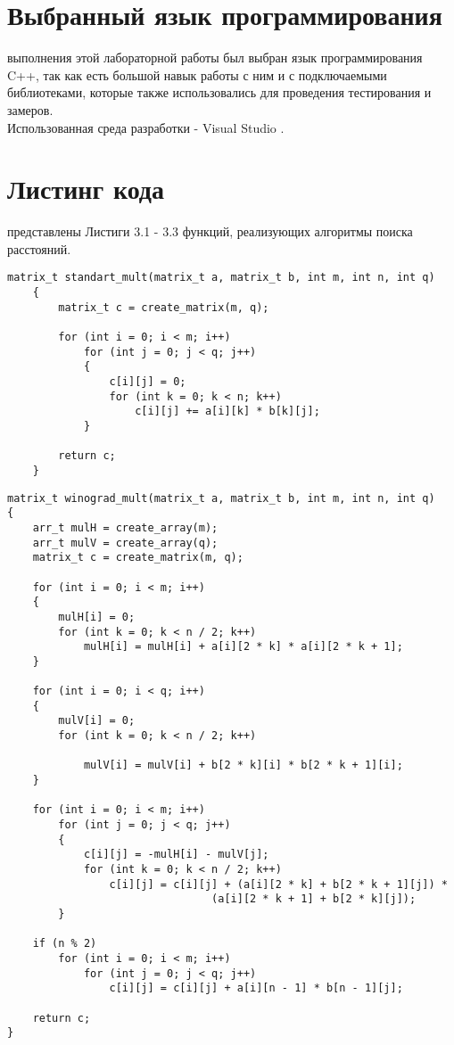 \section{Выбранный язык программирования}
 выполнения этой лабораторной работы был выбран язык программирования C++, так как есть большой навык работы с ним и с подключаемыми библиотеками, которые также использовались для проведения тестирования и замеров.\\

Использованная среда разработки - Visual Studio \cite{Visual}.

\section{Листинг кода}
 представлены Листиги 3.1 - 3.3 функций, реализующих алгоритмы поиска расстояний.
\begin{lstlisting}[label=code, caption = Стандартный алгоритм умножения матриц]
	matrix_t standart_mult(matrix_t a, matrix_t b, int m, int n, int q)
	{
		matrix_t c = create_matrix(m, q);
		
		for (int i = 0; i < m; i++)
			for (int j = 0; j < q; j++)
			{
				c[i][j] = 0;
				for (int k = 0; k < n; k++)
					c[i][j] += a[i][k] * b[k][j];
			}
		
		return c;
	}
\end{lstlisting}

\begin{lstlisting}[label=code, caption = Алгоритм Винограда]
matrix_t winograd_mult(matrix_t a, matrix_t b, int m, int n, int q)
{
	arr_t mulH = create_array(m);
	arr_t mulV = create_array(q);
	matrix_t c = create_matrix(m, q);
	
	for (int i = 0; i < m; i++)
	{
		mulH[i] = 0;
		for (int k = 0; k < n / 2; k++)
			mulH[i] = mulH[i] + a[i][2 * k] * a[i][2 * k + 1];
	}
	
	for (int i = 0; i < q; i++)
	{
		mulV[i] = 0;
		for (int k = 0; k < n / 2; k++)
			
			mulV[i] = mulV[i] + b[2 * k][i] * b[2 * k + 1][i];
	}
	
	for (int i = 0; i < m; i++)
		for (int j = 0; j < q; j++)
		{
			c[i][j] = -mulH[i] - mulV[j];
			for (int k = 0; k < n / 2; k++)
				c[i][j] = c[i][j] + (a[i][2 * k] + b[2 * k + 1][j]) * 
						  		(a[i][2 * k + 1] + b[2 * k][j]);
		}
	
	if (n % 2)
		for (int i = 0; i < m; i++)
			for (int j = 0; j < q; j++)
				c[i][j] = c[i][j] + a[i][n - 1] * b[n - 1][j];
	
	return c;
}
\end{lstlisting}

